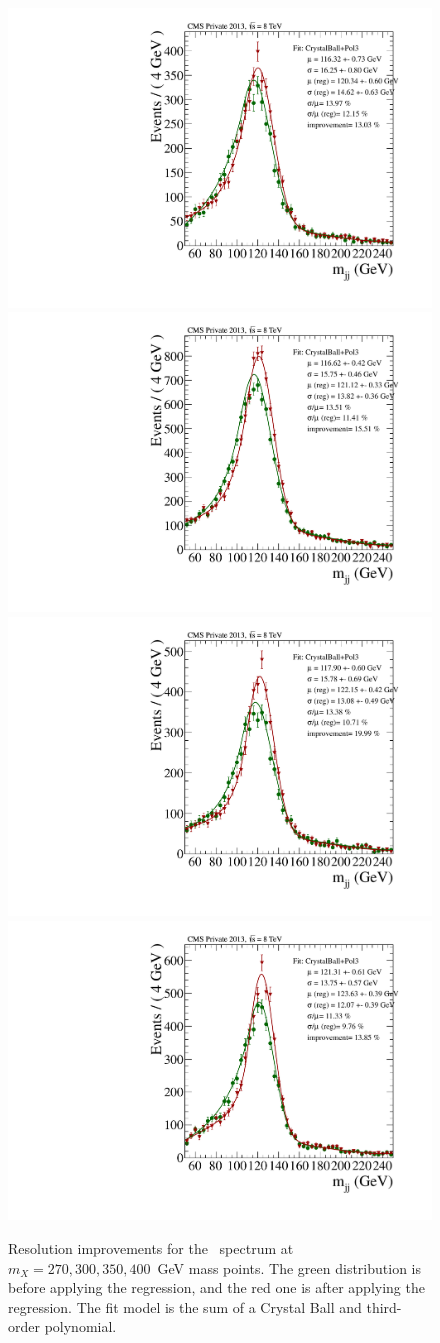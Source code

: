 \begin{figure}[ht]
\begin{center}
\includegraphics[width=.4\textwidth]{figures/objects/mjj_m270_CrystalBall_allcat.pdf}
\includegraphics[width=.4\textwidth]{figures/objects/mjj_m300_CrystalBall_allcat.pdf}
\\
\includegraphics[width=.4\textwidth]{figures/objects/mjj_m350_CrystalBall_allcat.pdf}
\includegraphics[width=.4\textwidth]{figures/objects/mjj_m400_CrystalBall_allcat.pdf}
\end{center}
\caption{Resolution improvements for the \Mjj\, spectrum at $m_X = 270, 300, 350, 400$~GeV mass points.
The green distribution is before applying the regression, and the red one is after applying the
regression. The fit model is the sum of a Crystal Ball and third-order polynomial.
}
\label{fig:regression_plots_improvement_mjj}
\end{figure}

